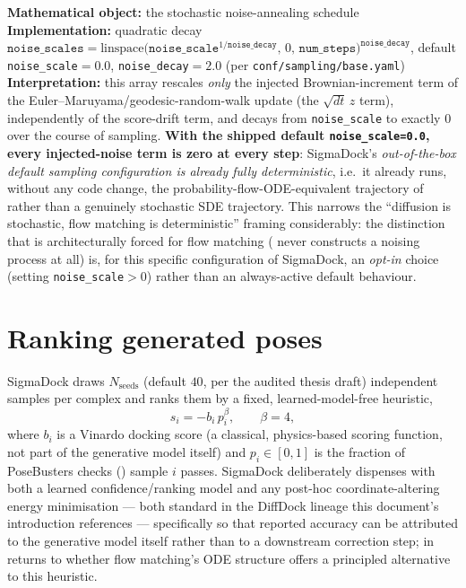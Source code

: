 \documentclass[11pt,a4paper]{report}
\theoremstyle{definition}
\theoremstyle{remark}
\newcommand{\file}[1]{\texttt{#1}}
\begin{document}
\begin{codebox}
\textbf{Mathematical object:} the stochastic noise-annealing schedule \\
\textbf{Implementation:} quadratic decay
$\texttt{noise\_scales} = \mathrm{linspace}\bigl(\texttt{noise\_scale}^{1/\texttt{noise\_decay}},\,0,\,\texttt{num\_steps}\bigr)^{\texttt{noise\_decay}}$,
default \texttt{noise\_scale}$=0.0$, \texttt{noise\_decay}$=2.0$ (per
\file{conf/sampling/base.yaml}) \\
\textbf{Interpretation:} this array rescales \emph{only} the injected
Brownian-increment term of the Euler--Maruyama/geodesic-random-walk update
(the $\sqrt{dt}\,z$ term), independently of the score-drift term, and
decays from \texttt{noise\_scale} to exactly $0$ over the course of
sampling. \textbf{With the shipped default \texttt{noise\_scale=0.0},
every injected-noise term is zero at every step}: SigmaDock's
\emph{out-of-the-box default sampling configuration is already fully
deterministic}, i.e.\ it already runs, without any code change, the
probability-flow-ODE-equivalent trajectory of 
rather than a genuinely stochastic SDE trajectory. This narrows the
``diffusion is stochastic, flow matching is deterministic'' framing
considerably: the distinction that is architecturally forced for flow
matching ( never constructs a noising process at
all) is, for this specific configuration of SigmaDock, an \emph{opt-in}
choice (setting \texttt{noise\_scale}$>0$) rather than an always-active
default behaviour.
\end{codebox}

\section{Ranking generated poses}
\label{sec:sigmadock-ranking}

SigmaDock draws $N_{\mathrm{seeds}}$ (default $40$, per the audited thesis
draft) independent samples per complex and ranks them by a fixed, learned-model-free
heuristic,
\[
s_i = -b_i\,p_i^\beta,
\qquad
\beta=4,
\]
where $b_i$ is a Vinardo docking score (a classical, physics-based scoring
function, not part of the generative model itself) and
$p_i\in[0,1]$ is the fraction of PoseBusters checks
() sample $i$ passes. SigmaDock deliberately
dispenses with both a learned confidence/ranking model and any post-hoc
coordinate-altering energy minimisation --- both standard in the
DiffDock lineage this document's introduction references --- specifically
so that reported accuracy can be attributed to the generative model itself
rather than to a downstream correction step; 
in  returns to whether flow matching's ODE structure
offers a principled alternative to this heuristic.
\end{document}
